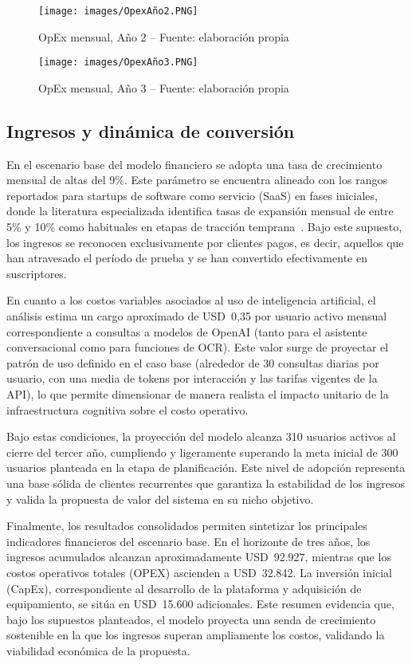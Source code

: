 \begin{figure}[!htbp]
  \centering
  \texttt{[image: images/OpexAño2.PNG]}
  \caption{OpEx mensual, Año 2 -- Fuente: elaboración propia}
  \label{fig:opex-anio2}
\end{figure}

\begin{figure}[!htbp]
  \centering
  \texttt{[image: images/OpexAño3.PNG]}
  \caption{OpEx mensual, Año 3 -- Fuente: elaboración propia}
  \label{fig:opex-anio3}
\end{figure}


\subsection{Ingresos y dinámica de conversión}

En el escenario base del modelo financiero se adopta una tasa de crecimiento mensual de altas del 9\%. Este parámetro se encuentra alineado con los rangos reportados para startups de software como servicio (SaaS) en fases iniciales, donde la literatura especializada identifica tasas de expansión mensual de entre 5\% y 10\% como habituales en etapas de tracción temprana~\parencite{burkland2024ltvcac}. Bajo este supuesto, los ingresos se reconocen exclusivamente por clientes pagos, es decir, aquellos que han atravesado el período de prueba y se han convertido efectivamente en suscriptores.

En cuanto a los costos variables asociados al uso de inteligencia artificial, el análisis estima un cargo aproximado de USD~0,35 por usuario activo mensual correspondiente a consultas a modelos de OpenAI (tanto para el asistente conversacional como para funciones de OCR). Este valor surge de proyectar el patrón de uso definido en el caso base (alrededor de 30 consultas diarias por usuario, con una media de tokens por interacción y las tarifas vigentes de la API), lo que permite dimensionar de manera realista el impacto unitario de la infraestructura cognitiva sobre el costo operativo.

Bajo estas condiciones, la proyección del modelo alcanza 310 usuarios activos al cierre del tercer año, cumpliendo y ligeramente superando la meta inicial de 300 usuarios planteada en la etapa de planificación. Este nivel de adopción representa una base sólida de clientes recurrentes que garantiza la estabilidad de los ingresos y valida la propuesta de valor del sistema en su nicho objetivo.

Finalmente, los resultados consolidados permiten sintetizar los principales indicadores financieros del escenario base. En el horizonte de tres años, los ingresos acumulados alcanzan aproximadamente USD~92.927, mientras que los costos operativos totales (OPEX) ascienden a USD~32.842. La inversión inicial (CapEx), correspondiente al desarrollo de la plataforma y adquisición de equipamiento, se sitúa en USD~15.600 adicionales. Este resumen evidencia que, bajo los supuestos planteados, el modelo proyecta una senda de crecimiento sostenible en la que los ingresos superan ampliamente los costos, validando la viabilidad económica de la propuesta.


